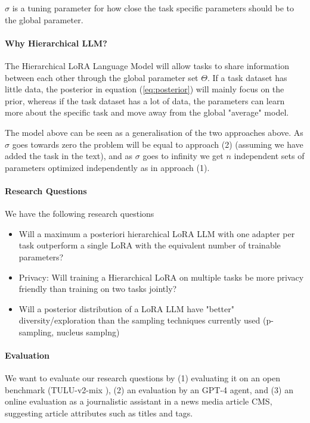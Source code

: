 \documentclass{article}
\begin{document}
$\sigma$ is a tuning parameter for how close the task specific parameters should be to the global parameter.

\paragraph{Why Hierarchical LLM?}
The Hierarchical LoRA Language Model will allow tasks to share information between each other through the global parameter set $\Theta$.
If a task dataset has little data, the posterior  in equation (\ref{eq:posterior}) will mainly focus on the prior, whereas if the task dataset has a lot of data, the parameters can learn more about the specific task and move away from the global "average" model.

The model above can be seen as a generalisation of the two approaches above.
As $\sigma$ goes towards zero the problem will be equal to approach (2) (assuming we have added the task in the text), 
and as $\sigma$ goes to infinity we get $n$ independent sets of parameters optimized independently as in approach (1).


\paragraph{Research Questions}
We have the following research questions
\begin{itemize}
    \item Will a maximum a posteriori hierarchical LoRA LLM  with one adapter per task outperform a single LoRA with the equivalent number of trainable parameters?
    \item Privacy: Will training a Hierarchical LoRA on multiple tasks be more privacy friendly than training on two tasks jointly?
    \item Will a posterior distribution of a LoRA LLM have "better" diversity/exploration than the sampling techniques currently used (p-sampling, nucleus samplng)
\end{itemize}

\paragraph{Evaluation}
We want to evaluate our research questions by (1) evaluating it on an open benchmark (TULU-v2-mix \cite{ivison_camels_2023}), (2) an evaluation by an GPT-4 agent, and (3) an online evaluation as a journalistic assistant in a news media article CMS, suggesting article attributes such as titles and tags.



\printbibliography
\end{document}
